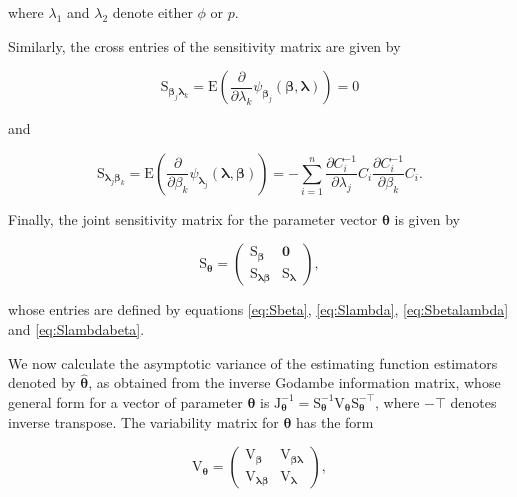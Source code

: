 \documentclass[9pt,a5paper,]{book}
\theoremstyle{definition}
\theoremstyle{definition}
\theoremstyle{remark}
\begin{document}
where \(\lambda_1\) and \(\lambda_2\) denote either \(\phi\) or \(p\).

Similarly, the cross entries of the sensitivity matrix are given by

\begin{equation}
\mathrm{S}_{\boldsymbol{\beta}_j \boldsymbol{\lambda}_k} = \mathrm{E}\left ( \frac{\partial}{\partial \lambda_k}\psi_{\boldsymbol{\beta}_j}(\boldsymbol{\beta}, \boldsymbol{\lambda})  \right ) = 0
\label{eq:Sbetalambda}
\end{equation}

and

\begin{equation}
\mathrm{S}_{\boldsymbol{\lambda}_j \boldsymbol{\beta}_k} = \mathrm{E}\left ( \frac{\partial}{\partial \beta_k}\psi_{\boldsymbol{\lambda}_j}(\boldsymbol{\lambda}, \boldsymbol{\beta})  \right ) = -\sum_{i=1}^n \frac{\partial C_i^{-1}}{\partial \lambda_j} C_i \frac{\partial C_i^{-1}}{\partial \beta_k} C_i.
\label{eq:Slambdabeta}
\end{equation}

Finally, the joint sensitivity matrix for the parameter vector
\(\boldsymbol{\theta}\) is given by

\begin{equation*}
\mathrm{S}_{\boldsymbol{\theta}} = \begin{pmatrix}
\mathrm{S}_{\boldsymbol{\beta}} & \boldsymbol{0} \\
\mathrm{S}_{\boldsymbol{\lambda}\boldsymbol{\beta}} & \mathrm{S}_{\boldsymbol{\lambda}}
\end{pmatrix},
\end{equation*}

whose entries are defined by equations \eqref{eq:Sbeta}, \eqref{eq:Slambda},
\eqref{eq:Sbetalambda} and \eqref{eq:Slambdabeta}.

We now calculate the asymptotic variance of the estimating function
estimators denoted by \(\boldsymbol{\hat{\theta}}\), as obtained from
the inverse Godambe information matrix, whose general form for a vector
of parameter \(\boldsymbol{\theta}\) is
\(\mathrm{J}^{-1}_{\boldsymbol{\theta}} = \mathrm{S}^{-1}_{\boldsymbol{\theta}} \mathrm{V}_{\boldsymbol{\theta}} \mathrm{S}^{-\top}_{\boldsymbol{\theta}}\),
where \(-\top\) denotes inverse transpose. The variability matrix for
\(\boldsymbol{\theta}\) has the form

\begin{equation}
\mathrm{V}_{\boldsymbol{\theta}} = \begin{pmatrix}
\mathrm{V}_{\boldsymbol{\beta}} & \mathrm{V}_{\boldsymbol{\beta}\boldsymbol{\lambda}} \\
\mathrm{V}_{\boldsymbol{\lambda}\boldsymbol{\beta}} & \mathrm{V}_{\boldsymbol{\lambda}}
\end{pmatrix},
\label{eq:VTHETA}
\end{equation}
\end{document}
